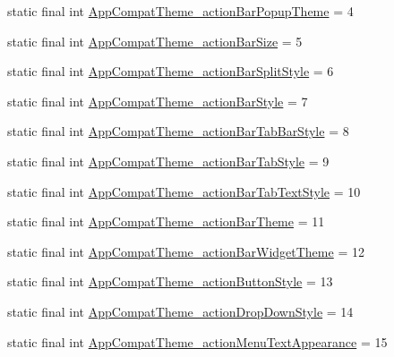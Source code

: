 \begin{DoxyCompactItemize}
\item 
static final int \mbox{\hyperlink{classandroid_1_1support_1_1design_1_1R_1_1styleable_a79a2c4ceb300b7facda280aac9831932}{App\+Compat\+Theme\+\_\+action\+Bar\+Popup\+Theme}} = 4
\item 
static final int \mbox{\hyperlink{classandroid_1_1support_1_1design_1_1R_1_1styleable_ae77cb3f50624fd81e653c35d793cffb8}{App\+Compat\+Theme\+\_\+action\+Bar\+Size}} = 5
\item 
static final int \mbox{\hyperlink{classandroid_1_1support_1_1design_1_1R_1_1styleable_ae5083d9c973cdfa9d72ebd78e750eff3}{App\+Compat\+Theme\+\_\+action\+Bar\+Split\+Style}} = 6
\item 
static final int \mbox{\hyperlink{classandroid_1_1support_1_1design_1_1R_1_1styleable_a61cf339a7c5a42cf8b0bffddde821996}{App\+Compat\+Theme\+\_\+action\+Bar\+Style}} = 7
\item 
static final int \mbox{\hyperlink{classandroid_1_1support_1_1design_1_1R_1_1styleable_a8a425f9bb1ba107a926a9904cfee276b}{App\+Compat\+Theme\+\_\+action\+Bar\+Tab\+Bar\+Style}} = 8
\item 
static final int \mbox{\hyperlink{classandroid_1_1support_1_1design_1_1R_1_1styleable_a714a6063e752ee587e64fdeb3e0ec77c}{App\+Compat\+Theme\+\_\+action\+Bar\+Tab\+Style}} = 9
\item 
static final int \mbox{\hyperlink{classandroid_1_1support_1_1design_1_1R_1_1styleable_a0fdd5eb64e3c53de499393a1d7cfa546}{App\+Compat\+Theme\+\_\+action\+Bar\+Tab\+Text\+Style}} = 10
\item 
static final int \mbox{\hyperlink{classandroid_1_1support_1_1design_1_1R_1_1styleable_abeaccb570b04649912436a34512a7829}{App\+Compat\+Theme\+\_\+action\+Bar\+Theme}} = 11
\item 
static final int \mbox{\hyperlink{classandroid_1_1support_1_1design_1_1R_1_1styleable_af39b7da92d56363d73839aba5c72d900}{App\+Compat\+Theme\+\_\+action\+Bar\+Widget\+Theme}} = 12
\item 
static final int \mbox{\hyperlink{classandroid_1_1support_1_1design_1_1R_1_1styleable_a0255cf570084f384214980925721c0ff}{App\+Compat\+Theme\+\_\+action\+Button\+Style}} = 13
\item 
static final int \mbox{\hyperlink{classandroid_1_1support_1_1design_1_1R_1_1styleable_a4e2cd4a980360108746ab21777611707}{App\+Compat\+Theme\+\_\+action\+Drop\+Down\+Style}} = 14
\item 
static final int \mbox{\hyperlink{classandroid_1_1support_1_1design_1_1R_1_1styleable_ad68a09beb02879ae2543dcc641682725}{App\+Compat\+Theme\+\_\+action\+Menu\+Text\+Appearance}} = 15

\end{DoxyCompactItemize}
